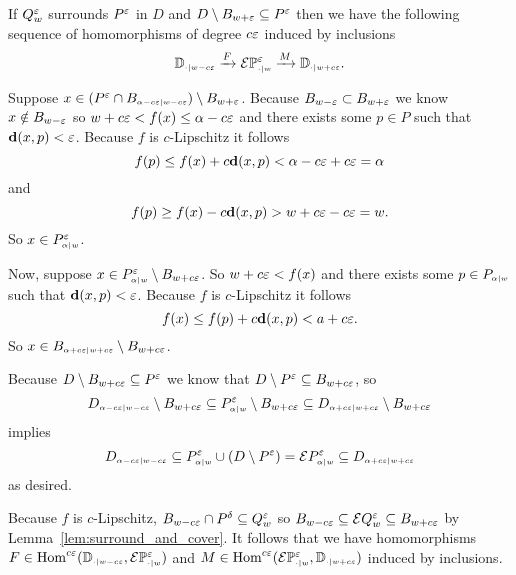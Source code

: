 \begin{lemma}\label{lem:p_interleave}
 If $Q_w^\e$ surrounds $P^\e$ in $D$ and $D\setminus B_{w + \e}\subseteq P^\e$ then we have the following sequence of homomorphisms of degree $c\e$ induced by inclusions
 \[\DD{w-c\e}\xrightarrow{F}\E\PP{w}{\e}\xrightarrow{M}\DD{w+c\e}.\]
\end{lemma}
\proofatend
  Suppose $x\in (P^\e\cap B\subi{w-c\e}{\alpha-c\e})\setminus B_{w+\e}$.
  Because $B_{w-\e}\subset B_{w+\e}$ we know $x\notin B_{w-\e}$ so $w+c\e < f(x)\leq \alpha-c\e$ and there exists some $p\in P$ such that $\dist(x, p) < \e$.
  Because $f$ is $c$-Lipschitz it follows
  \[ f(p)\leq f(x) + c\dist(x, p) < \alpha - c\e + c\e = \alpha\]
  and
  \[ f(p)\geq f(x) - c\dist(x, p) > w+c\e-c\e = w.\]
  So $x\in P\subi{w}{\alpha}^\e$.

  Now, suppose $x\in P\subi{w}{\alpha}^\e\setminus B_{w+c\e}$.
  So $w+c\e < f(x)$ and there exists some $p\in P\subi{w}{\alpha}$ such that $\dist(x,p) < \e$.
  Because $f$ is $c$-Lipschitz it follows
  \[ f(x) \leq f(p) + c\dist(x,p) < a + c\e.\]
  So $x\in B\subi{w+c\e}{\alpha+c\e}\setminus B_{w+c\e}$.

  Because $D\setminus B_{w+c\e}\subseteq P^\e$ we know that $D\setminus P^\e \subseteq B_{w+c\e}$, so
  \[D\subi{w-c\e}{\alpha-c\e}\setminus B_{w+c\e} \subseteq P\subi{w}{\alpha}^\e\setminus B_{w+c\e}\subseteq D\subi{w+c\e}{\alpha+c\e}\setminus B_{w+c\e}\]
  implies
  \[ D\subi{w-c\e}{\alpha-c\e}\subseteq P\subi{w}{\alpha}^\e\cup (D\setminus P^\e) = \ext{P\subi{w}{\alpha}^\e} \subseteq D\subi{w+c\e}{\alpha+c\e} \]
  as desired.

  Because $f$ is $c$-Lipschitz, $B_{w-c\e}\cap P^\delta\subseteq Q_{w}^\e$ so $B_{w-c\e} \subseteq \E Q_w^\e\subseteq B_{w+c\e}$ by Lemma~\ref{lem:surround_and_cover}.
  It follows that we have homomorphisms $F\in \Hom^{c\e}(\DD{w-c\e}, \E\PP{w}{\e})$ and $M\in\Hom^{c\e}(\E\PP{w}{\e}, \DD{w+c\e})$ induced by inclusions.

\endproofatend

